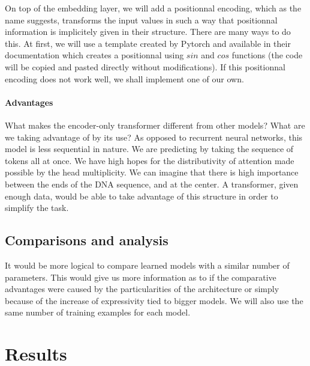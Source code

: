 \documentclass[11pt]{article}
\begin{document}
On top of the embedding layer, we will add a positionnal encoding, which as the
name suggests, transforms the input values in such a way that positionnal information 
is implicitely given in their structure. There are many ways to do this. At first, we will use 
a template created by Pytorch and available in their documentation which creates
a positionnal using $sin$ and $cos$ functions (the code will be copied and 
pasted directly without modifications). If this positionnal encoding does not
work well, we shall implement one of our own.




\paragraph{Advantages}
What makes the encoder-only transformer different from other models? What are
we taking advantage of by its use? As opposed to recurrent neural networks, 
this model is less sequential in nature. We are predicting by 
taking the sequence of tokens all at once. We have high hopes for the 
distributivity of attention made possible by the head multiplicity.
We can imagine that there is high importance between the ends of the DNA 
sequence, and at the center. A transformer, given enough data, would 
be able to take advantage of this structure in order to simplify the task.


\subsection{Comparisons and analysis}
It would be more logical to compare learned models with a similar 
number of parameters. This would give us more information as 
to if the comparative advantages were caused by the particularities 
of the architecture or simply because of the increase of expressivity 
tied to bigger models. We will also use the same number 
of training examples for each model.

\section{Results}
\end{document}
